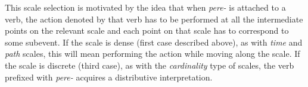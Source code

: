 \begin{enumerate}
\end{enumerate}


This scale selection is motivated by the idea that when \textit{pere-}   is attached to a verb, the action denoted by that verb has to be performed at all the intermediate points on the relevant scale and each point on that scale has to correspond to some subevent. If the scale is dense (first case described above), as with \textit{time} and \textit{path} scales, this will mean performing the action while moving along the scale. If the scale is discrete (third case), as with the \textit{cardinality} type of scales, the verb prefixed with \textit{pere-}   acquires a distributive  interpretation. 

